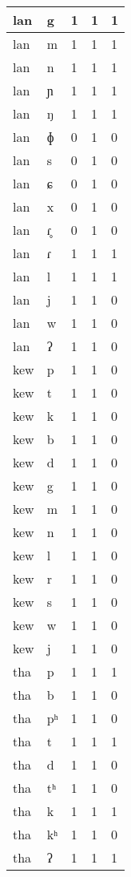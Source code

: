 \begin{longtable}{ | l | l | l | l | l | }
	lan & g & 1 & 1 & 1 \\ \hline
	lan & m & 1 & 1 & 1 \\ \hline
	lan & n & 1 & 1 & 1 \\ \hline
	lan & ɲ & 1 & 1 & 1 \\ \hline
	lan & ŋ & 1 & 1 & 1 \\ \hline
	lan & ɸ & 0 & 1 & 0 \\ \hline
	lan & s & 0 & 1 & 0 \\ \hline
	lan & ɕ & 0 & 1 & 0 \\ \hline
	lan & x & 0 & 1 & 0 \\ \hline
	lan & ɾ̥ & 0 & 1 & 0 \\ \hline
	lan & ɾ & 1 & 1 & 1 \\ \hline
	lan & l & 1 & 1 & 1 \\ \hline
	lan & j & 1 & 1 & 0 \\ \hline
	lan & w & 1 & 1 & 0 \\ \hline
	lan & ʔ & 1 & 1 & 0 \\ \hline
	kew & p & 1 & 1 & 0 \\ \hline
	kew & t & 1 & 1 & 0 \\ \hline
	kew & k & 1 & 1 & 0 \\ \hline
	kew & b & 1 & 1 & 0 \\ \hline
	kew & d & 1 & 1 & 0 \\ \hline
	kew & g & 1 & 1 & 0 \\ \hline
	kew & m & 1 & 1 & 0 \\ \hline
	kew & n & 1 & 1 & 0 \\ \hline
	kew & l & 1 & 1 & 0 \\ \hline
	kew & r & 1 & 1 & 0 \\ \hline
	kew & s & 1 & 1 & 0 \\ \hline
	kew & w & 1 & 1 & 0 \\ \hline
	kew & j & 1 & 1 & 0 \\ \hline
	tha & p & 1 & 1 & 1 \\ \hline
	tha & b & 1 & 1 & 0 \\ \hline
	tha & pʰ & 1 & 1 & 0 \\ \hline
	tha & t & 1 & 1 & 1 \\ \hline
	tha & d & 1 & 1 & 0 \\ \hline
	tha & tʰ & 1 & 1 & 0 \\ \hline
	tha & k & 1 & 1 & 1 \\ \hline
	tha & kʰ & 1 & 1 & 0 \\ \hline
	tha & ʔ & 1 & 1 & 1 \\ \hline

\end{longtable}
